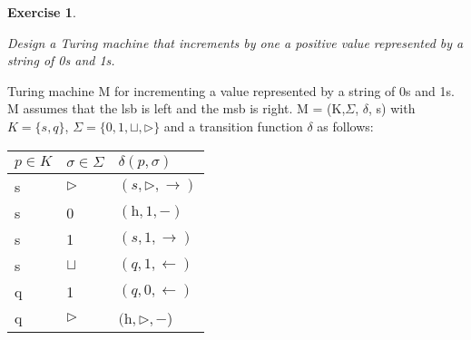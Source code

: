 \documentclass [11pt]{article}
\newtheorem{exercise}[theorem]{Exercise}
\newcommand{\blank}{\sqcup}
\newcommand{\ssym}{\triangleright}
\newcommand{\halt}{\mbox{h}}
\newcommand{\stay}{-}
\newcommand{\solution}[1]{\noindent {\bf Solution.}  #1}
\begin{document}


\begin{exercise}
  \label{ex:turing}

  Design a Turing machine that increments by one a positive value represented by a string of 0s and 1s.

\end{exercise}

\solution{
Turing machine M for incrementing a value represented by a string of 0s and 1s. 
M assumes that the lsb is left and the msb is right.
M = (K,$\Sigma$, $\delta$, s) with $K=\{s, q\}$, $\Sigma=\{0,1,\blank, \ssym\}$ and a transition function $\delta$ as follows:\\

\begin{center}
    \begin{tabular}{| l  l | l |}
    \hline
    $p \in K$ & $\sigma \in \Sigma$ & $\delta(p,\sigma)$\\ \hline
    s         &       $ \ssym  $    &  $ (s,\ssym,\rightarrow) $               \\ \hline
    s         &        0            &  $(\halt,1,\stay)$                 \\ \hline
    s         &        1            &  $(s,1,\rightarrow)$                 \\ \hline
    s         &       $ \blank $    &  $(q,1,\leftarrow)$                 \\ \hline
    q         &        1            &  $(q,0,\leftarrow)$                 \\ \hline
    q         &        $\ssym$      &  $(\halt,\ssym,\stay$)                 \\ \hline
    \hline
    \end{tabular}
\end{center}

}
\end{document}
